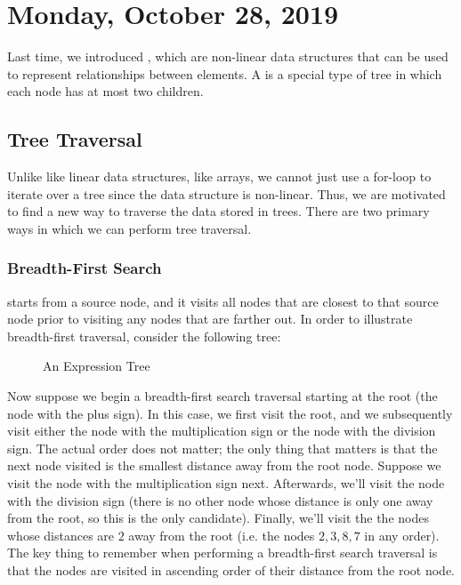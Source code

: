 \section{Monday, October 28, 2019}
Last time, we introduced , which are non-linear data structures that can be used to represent relationships between elements. A  is a special type of tree in which each node has at most two children.

\subsection{Tree Traversal}

Unlike like linear data structures, like arrays, we cannot just use a for-loop to iterate over a tree since the data structure is non-linear. Thus, we are motivated to find a new way to traverse the data stored in trees. There are two primary ways in which we can perform tree traversal.

\subsubsection{Breadth-First Search}

 starts from a source node, and it visits all nodes that are closest to that source node prior to visiting any nodes that are farther out. In order to illustrate breadth-first traversal, consider the following tree:

\begin{figure}[h]
\centering
{}
\caption{An Expression Tree}
\end{figure}

Now suppose we begin a breadth-first search traversal starting at the root (the node with the plus sign). In this case, we first visit the root, and we subsequently visit either the node with the multiplication sign or the node with the division sign. The actual order does not matter; the only thing that matters is that the next node visited is the smallest distance away from the root node. Suppose we visit the node with the multiplication sign next. Afterwards, we'll visit the node with the division sign (there is no other node whose distance is only one away from the root, so this is the only candidate). Finally, we'll visit the the nodes whose distances are $2$ away from the root (i.e. the nodes $2, 3, 8, 7$ in any order). 
The key thing to remember when performing a breadth-first search traversal is that the nodes are visited in ascending order of their distance from the root node. 

